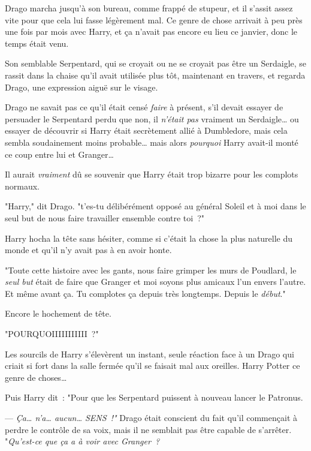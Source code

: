Drago marcha jusqu'à son bureau, comme frappé de stupeur, et il s'assit assez vite pour que cela lui fasse légèrement mal. Ce genre de chose arrivait à peu près une fois par mois avec Harry, et ça n'avait pas encore eu lieu ce janvier, donc le temps était venu.

Son semblable Serpentard, qui se croyait ou ne se croyait pas être un Serdaigle, se rassit dans la chaise qu'il avait utilisée plus tôt, maintenant en travers, et regarda Drago, une expression aiguë sur le visage.

Drago ne savait pas ce qu'il était censé \emph{faire} à présent, s'il devait essayer de persuader le Serpentard perdu que non, il \emph{n'était pas} vraiment un Serdaigle… ou essayer de découvrir si Harry était secrètement allié à Dumbledore, mais cela sembla soudainement moins probable… mais alors \emph{pourquoi} Harry avait-il monté ce coup entre lui et Granger…

Il aurait \emph{vraiment} dû se souvenir que Harry était trop bizarre pour les complots normaux.

"Harry," dit Drago. "t'es-tu délibérément opposé au général Soleil et à moi dans le seul but de nous faire travailler ensemble contre toi~?"

Harry hocha la tête sans hésiter, comme si c'était la chose la plus naturelle du monde et qu'il n'y avait pas à en avoir honte.

"Toute cette histoire avec les gants, nous faire grimper les murs de Poudlard, le \emph{seul but} était de faire que Granger et moi soyons plus amicaux l'un envers l'autre. Et même avant ça. Tu complotes ça depuis très longtemps. Depuis le \emph{début}."

Encore le hochement de tête.

"POURQUOIIIIIIIIIII~?"

Les sourcils de Harry s'élevèrent un instant, seule réaction face à un Drago qui criait si fort dans la salle fermée qu'il se faisait mal aux oreilles.  Harry Potter  ce genre de choses…

Puis Harry dit~: "Pour que les Serpentard puissent à nouveau lancer le Patronus.

--- \emph{Ça… n'a… aucun… SENS~!"} Drago était conscient du fait qu'il commençait à perdre le contrôle de sa voix, mais il ne semblait pas être capable de s'arrêter. "\emph{Qu'est-ce que ça a à voir avec Granger~?}

